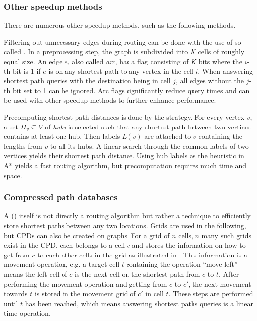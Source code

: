 		\subsubsection{Other speedup methods}
		\label{subsubsec:other-speedup-methods}
		
			There are numerous other speedup methods, such as the following methods.
			
			Filtering out unnecessary edges during routing can be done with the use of so-called \cite{bast-transportation-networks}.
			In a preprocessing step, the graph is subdivided into $K$ cells of roughly equal size.
			An edge $e$, also called \emph{arc}, has a flag consisting of $K$ bits where the $i$-th bit is 1 if $e$ is on any shortest path to any vertex in the cell $i$.
			When answering shortest path queries with the destination being in cell $j$, all edges without the $j$-th bit set to 1 can be ignored.
			Arc flags significantly reduce query times and can be used with other speedup methods to further enhance performance.
			
			Precomputing shortest path distances is done by the  strategy\cite{bast-transportation-networks}.
			For every vertex $v$, a set $H_v \subseteq V$ of \emph{hubs} is selected such that any shortest path between two vertices contains at least one hub.
			Then labels $L(v)$ are attached to $v$ containing the lengths from $v$ to all its hubs.
			A linear search through the common labels of two vertices yields their shortest path distance.
			Using hub labels as the heuristic in A* yields a fast routing algorithm, but precomputation requires much time and space.
		
		\subsubsection{Compressed path databases}
		\label{subsubsec:cpd}
		
			A  () itself is not directly a routing algorithm but rather a technique to efficiently store shortest paths between any two locations\cite{botea-cpd-2013}.
			Grids are used in the following, but CPDs can also be created on graphs.
			For a grid of $n$ cells, $n$ many such grids exist in the CPD, each belongs to a cell $c$ and stores the information on how to get from $c$ to each other cells in the grid as illustrated in .
			This information is a movement operation, e.g. a target cell $t$ containing the operation \enquote{move left} means the left cell of $c$ is the next cell on the shortest path from $c$ to $t$.
			After performing the movement operation and getting from $c$ to $c'$, the next movement towards $t$ is stored in the movement grid of $c'$ in cell $t$.
			These steps are performed until $t$ has been reached, which means answering shortest paths queries is a linear time operation.
			

